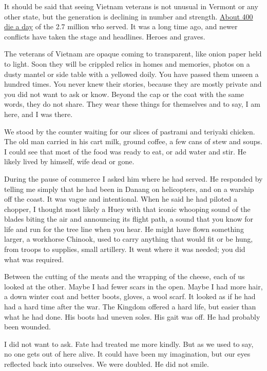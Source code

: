 It should be said that seeing Vietnam veterans is not unusual in Vermont
or any other state, but the generation is declining in number and
strength.
\href{https://www.nytimes.com/2013/03/26/science/how-many-vietnam-veterans-are-still-alive.html}{About
400 die a day} of the 2.7 million who served. It was a long time ago,
and newer conflicts have taken the stage and headlines. Heroes and
graves.

The veterans of Vietnam are opaque coming to transparent, like onion
paper held to light. Soon they will be crippled relics in homes and
memories, photos on a dusty mantel or side table with a yellowed doily.
You have passed them unseen a hundred times. You never knew their
stories, because they are mostly private and you did not want to ask or
know. Beyond the cap or the coat with the same words, they do not share.
They wear these things for themselves and to say, I am here, and I was
there.

We stood by the counter waiting for our slices of pastrami and teriyaki
chicken. The old man carried in his cart milk, ground coffee, a few cans
of stew and soups. I could see that most of the food was ready to eat,
or add water and stir. He likely lived by himself, wife dead or gone.

During the pause of commerce I asked him where he had served. He
responded by telling me simply that he had been in Danang on
helicopters, and on a warship off the coast. It was vague and
intentional. When he said he had piloted a chopper, I thought most
likely a Huey with that iconic whooping sound of the blades biting the
air and announcing its flight path, a sound that you know for life and
run for the tree line when you hear. He might have flown something
larger, a workhorse Chinook, used to carry anything that would fit or be
hung, from troops to supplies, small artillery. It went where it was
needed; you did what was required.

Between the cutting of the meats and the wrapping of the cheese, each of
us looked at the other. Maybe I had fewer scars in the open. Maybe I had
more hair, a down winter coat and better boots, gloves, a wool scarf. It
looked as if he had had a hard time after the war. The Kingdom offered a
hard life, but easier than what he had done. His boots had uneven soles.
His gait was off. He had probably been wounded.

I did not want to ask. Fate had treated me more kindly. But as we used
to say, no one gets out of here alive. It could have been my
imagination, but our eyes reflected back into ourselves. We were
doubled. He did not smile.

